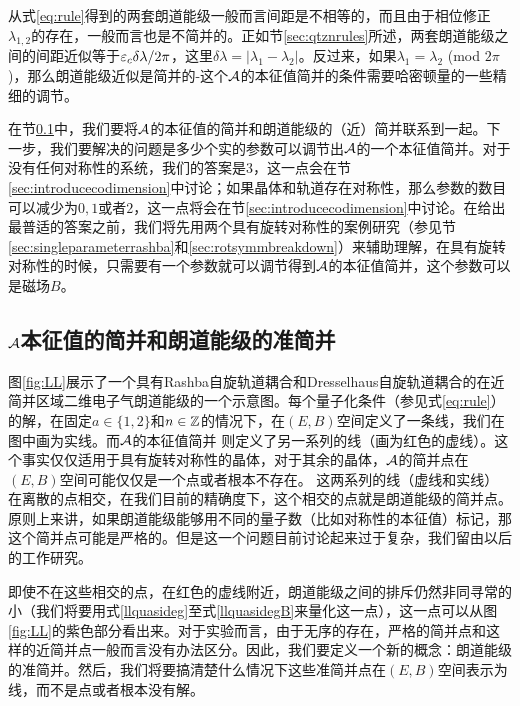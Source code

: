 从式\ref{eq:rule}得到的两套朗道能级一般而言间距是不相等的，而且由于相位修正$\lambda_{1,2}$的存在，一般而言也是不简并的。正如节\ref{sec:qtznrules}所述，两套朗道能级之间的间距近似等于$\varepsilon_c\delta \lambda/2\pi$，这里$\delta \lambda=|\lambda_1-\lambda_2|$。反过来，如果$\lambda_1{=}\lambda_2$ (mod $2\pi$)，那么朗道能级近似是简并的-这个${\cal A}$的本征值简并的条件需要哈密顿量的一些精细的调节。

在节\ref{sec:relatedegeneracies}中，我们要将${\cal A}$的本征值的简并和朗道能级的（近）简并联系到一起。下一步，我们要解决的问题是多少个实的参数可以调节出${\cal A}$的一个本征值简并。对于没有任何对称性的系统，我们的答案是$3$，这一点会在节\ref{sec:introducecodimension}中讨论；如果晶体和轨道存在对称性，那么参数的数目可以减少为$0,1$或者$2$，这一点将会在节\ref{sec:introducecodimension}中讨论。在给出最普适的答案之前，我们将先用两个具有旋转对称性的案例研究（参见节\ref{sec:singleparameterrashba}和\ref{sec:rotsymmbreakdown}）来辅助理解，在具有旋转对称性的时候，只需要有一个参数就可以调节得到${\cal A}$的本征值简并，这个参数可以是磁场$B$。

\subsection{${\cal A}$本征值的简并和朗道能级的准简并}\label{sec:relatedegeneracies}


图\ref{fig:LL}展示了一个具有Rashba自旋轨道耦合和Dresselhaus自旋轨道耦合的在近简并区域二维电子气朗道能级的一个示意图。每个量子化条件（参见式\ref{eq:rule}）的解，在固定$a\in \{1,2\}$和$n \in \mathbb{Z}$的情况下，在$(E,B)$空间定义了一条线，我们在图中画为实线。而${\cal A}$的本征值简并
则定义了另一系列的线（画为红色的虚线）。这个事实仅仅适用于具有旋转对称性的晶体，对于其余的晶体，${\cal A}$的简并点在$(E,B)$空间可能仅仅是一个点或者根本不存在。 这两系列的线（虚线和实线）在离散的点相交，在我们目前的精确度下，这个相交的点就是朗道能级的简并点。原则上来讲，如果朗道能级能够用不同的量子数（比如对称性的本征值）标记，那这个简并点可能是严格的。但是这一个问题目前讨论起来过于复杂，我们留由以后的工作研究。

即使不在这些相交的点，在红色的虚线附近，朗道能级之间的排斥仍然非同寻常的小（我们将要用式\ref{llquasideg}至式\ref{llquasidegB}来量化这一点），这一点可以从图\ref{fig:LL}的紫色部分看出来。对于实验而言，由于无序的存在，严格的简并点和这样的近简并点一般而言没有办法区分\cite{shoenberg_magnetic_2009}。因此，我们要定义一个新的概念：朗道能级的准简并。然后，我们将要搞清楚什么情况下这些准简并点在$(E,B)$空间表示为线，而不是点或者根本没有解。


